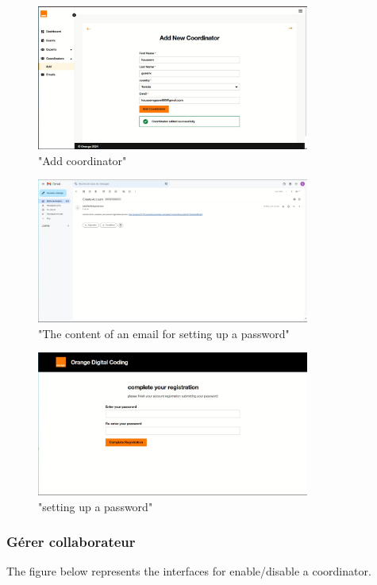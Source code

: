 \begin{figure}[h!]
    \centering
    \includegraphics[width=0.8\textwidth]{images/addcor.JPG}
    \caption{"Add coordinator"}
    \label{fig:"Add coordinator"}
\end{figure}
\begin{figure}[h!]
    \centering
    \includegraphics[width=0.8\textwidth]{images/link.JPG}
    \caption{"The content of an email for setting up a password"}
    \label{fig:"The content of an email for setting up a password"}
\end{figure}
\newpage
\begin{figure}[h!]
    \centering
    \includegraphics[width=0.8\textwidth]{images/pwd regi.JPG}
    \caption{"setting up a password"}
    \label{fig:"setting up a password"}
\end{figure}
\newpage

\subsubsection{Gérer collaborateur}
The figure below represents the interfaces for enable/disable a coordinator.

